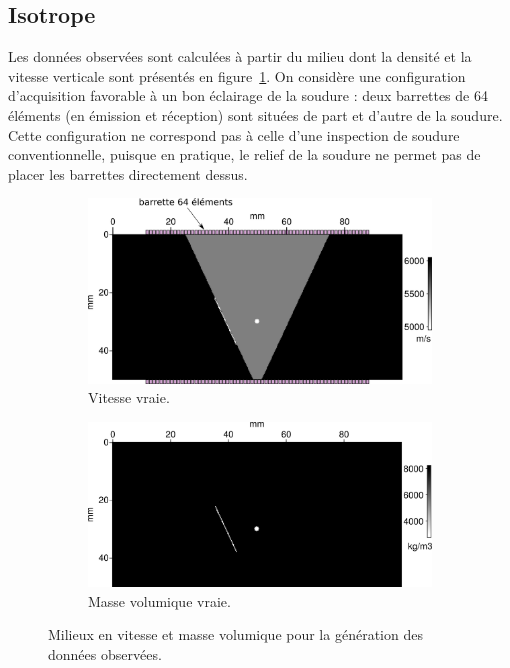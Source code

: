 
\subsection{Isotrope}

Les données observées sont calculées à partir du milieu dont la densité et  la vitesse verticale sont présentés en figure~\ref{app:iso:model}. On considère une configuration d'acquisition favorable à un bon éclairage de la soudure : deux barrettes de 64 éléments (en émission et réception) sont situées de part et d'autre de la soudure. Cette configuration ne correspond pas à celle d'une inspection de soudure conventionnelle, puisque en pratique, le relief de la soudure ne permet pas de placer les barrettes directement dessus.\\

\begin{figure}[!h]
	\centering
	\begin{subfigure}[b]{0.45\textwidth}
		\includegraphics[width=\textwidth]{img/milieux_ps/vp_true.png}
		\caption{Vitesse vraie.}
	\end{subfigure}
	\begin{subfigure}[b]{0.45\textwidth}
		\includegraphics[width=\textwidth]{img/milieux_ps/rho_true.png}
		\caption{Masse volumique vraie.}
	\end{subfigure}
	\label{app:iso:model}
	\caption{Milieux en vitesse et masse volumique pour la génération des données observées.}
\end{figure}

